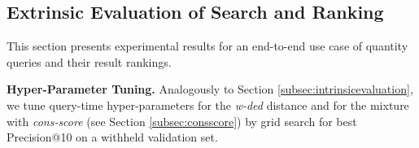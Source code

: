





\subsection{Extrinsic Evaluation of 
Search and Ranking}
\label{subsec:extrinsicevaluation}
This section presents experimental results for an end-to-end use case of
quantity queries and their result rankings.

\vspace{0.1cm}
\noindent \textbf{Hyper-Parameter Tuning.}
Analogously to 
Section \ref{subsec:intrinsicevaluation},
we tune query-time hyper-parameters for the
\textit{w-ded} distance
and for the mixture with
\textit{cons-score} (see Section \ref{subsec:consscore})
by grid search for 
best Precision@10 on a withheld validation set.

